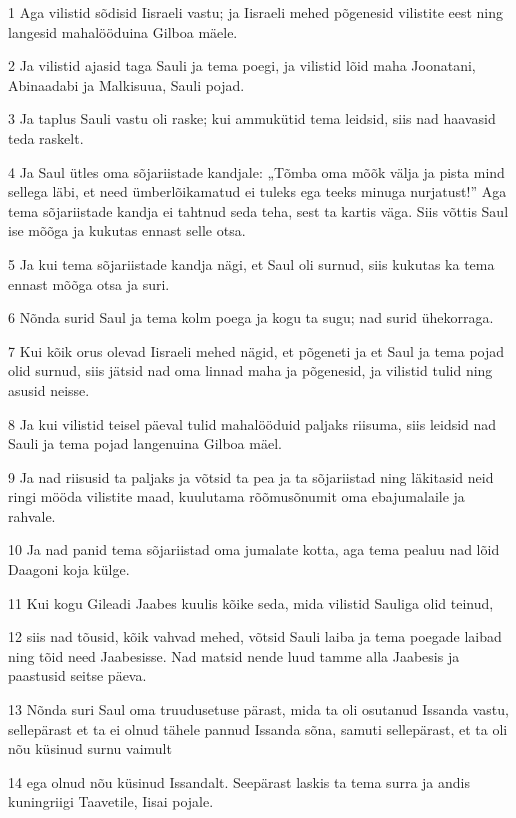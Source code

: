 \par 1 Aga vilistid sõdisid Iisraeli vastu; ja Iisraeli mehed põgenesid vilistite eest ning langesid mahalööduina Gilboa mäele.
\par 2 Ja vilistid ajasid taga Sauli ja tema poegi, ja vilistid lõid maha Joonatani, Abinaadabi ja Malkisuua, Sauli pojad.
\par 3 Ja taplus Sauli vastu oli raske; kui ammukütid tema leidsid, siis nad haavasid teda raskelt.
\par 4 Ja Saul ütles oma sõjariistade kandjale: „Tõmba oma mõõk välja ja pista mind sellega läbi, et need ümberlõikamatud ei tuleks ega teeks minuga nurjatust!” Aga tema sõjariistade kandja ei tahtnud seda teha, sest ta kartis väga. Siis võttis Saul ise mõõga ja kukutas ennast selle otsa.
\par 5 Ja kui tema sõjariistade kandja nägi, et Saul oli surnud, siis kukutas ka tema ennast mõõga otsa ja suri.
\par 6 Nõnda surid Saul ja tema kolm poega ja kogu ta sugu; nad surid ühekorraga.
\par 7 Kui kõik orus olevad Iisraeli mehed nägid, et põgeneti ja et Saul ja tema pojad olid surnud, siis jätsid nad oma linnad maha ja põgenesid, ja vilistid tulid ning asusid neisse.
\par 8 Ja kui vilistid teisel päeval tulid mahalööduid paljaks riisuma, siis leidsid nad Sauli ja tema pojad langenuina Gilboa mäel.
\par 9 Ja nad riisusid ta paljaks ja võtsid ta pea ja ta sõjariistad ning läkitasid neid ringi mööda vilistite maad, kuulutama rõõmusõnumit oma ebajumalaile ja rahvale.
\par 10 Ja nad panid tema sõjariistad oma jumalate kotta, aga tema pealuu nad lõid Daagoni koja külge.
\par 11 Kui kogu Gileadi Jaabes kuulis kõike seda, mida vilistid Sauliga olid teinud,
\par 12 siis nad tõusid, kõik vahvad mehed, võtsid Sauli laiba ja tema poegade laibad ning tõid need Jaabesisse. Nad matsid nende luud tamme alla Jaabesis ja paastusid seitse päeva.
\par 13 Nõnda suri Saul oma truudusetuse pärast, mida ta oli osutanud Issanda vastu, sellepärast et ta ei olnud tähele pannud Issanda sõna, samuti sellepärast, et ta oli nõu küsinud surnu vaimult
\par 14 ega olnud nõu küsinud Issandalt. Seepärast laskis ta tema surra ja andis kuningriigi Taavetile, Iisai pojale.

